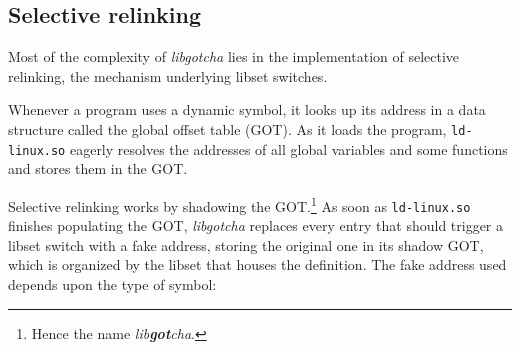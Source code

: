 \subsection{Selective relinking}
\label{sec:relinking}

Most of the complexity of \textit{libgotcha} lies in the implementation of selective
relinking, the mechanism underlying libset switches.

Whenever a program uses a dynamic symbol, it looks up its address in a data structure
called the global offset table (GOT).  As it loads the program, \texttt{ld-linux.so}
eagerly resolves the addresses of all global variables and some functions and stores
them in the GOT.

Selective relinking works by shadowing the GOT.\footnote{Hence the name
\textit{lib\textbf{got}cha}.}  As soon as \texttt{ld-linux.so} finishes populating
the GOT, \textit{libgotcha} replaces every entry that should trigger a libset switch
with a fake address, storing the original one in its shadow GOT, which is organized
by the libset that houses the definition.  The fake address used depends upon the
type of symbol:


